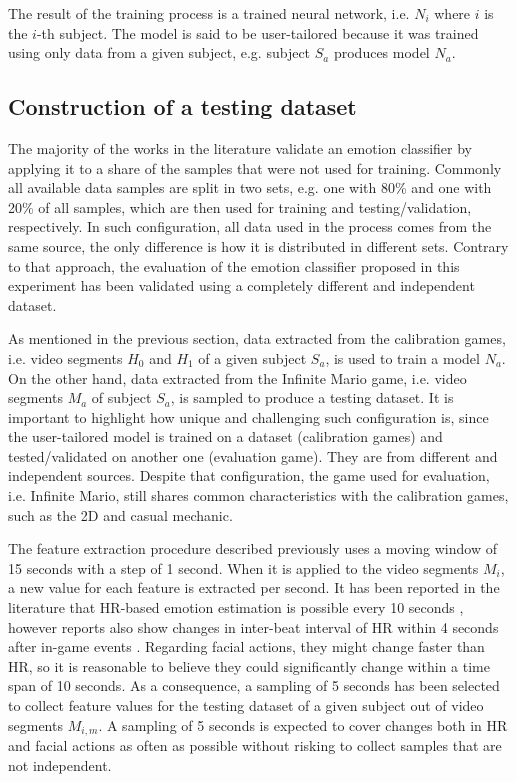 The result of the training process is a trained neural network, i.e. $N_i$ where $i$ is the $i$-th subject. The model is said to be user-tailored because it was trained using only data from a given subject, e.g. subject $S_a$ produces model $N_a$.

\subsection{Construction of a testing dataset}
\label{sec:experiment2-construction-validation}

The majority of the works in the literature validate an emotion classifier by applying it to a share of the samples that were not used for training. Commonly all available data samples are split in two sets, e.g. one with 80\% and one with 20\% of all samples, which are then used for training and testing/validation, respectively. In such configuration, all data used in the process comes from the same source, the only difference is how it is distributed in different sets. Contrary to that approach, the evaluation of the emotion classifier proposed in this experiment has been validated using a completely different and independent dataset.

As mentioned in the previous section, data extracted from the calibration games, i.e. video segments $H_0$ and $H_1$ of a given subject $S_a$, is used to train a model $N_a$. On the other hand, data extracted from the Infinite Mario game, i.e. video segments $M_a$ of subject $S_a$, is sampled to produce a testing dataset. It is important to highlight how unique and challenging such configuration is, since the user-tailored model is trained on a dataset (calibration games) and tested/validated on another one (evaluation game). They are from different and independent sources. Despite that configuration, the game used for evaluation, i.e. Infinite Mario, still shares common characteristics with the calibration games, such as the 2D and casual mechanic.

The feature extraction procedure described previously uses a moving window of 15 seconds with a step of 1 second. When it is applied to the video segments $M_i$, a new value for each feature is extracted per second. It has been reported in the literature that HR-based emotion estimation is possible every 10 seconds \parencite{valenza2014revealing}, however reports also show changes in inter-beat interval of HR within 4 seconds after in-game events \parencite{ravaja20051}. Regarding facial actions, they might change faster than HR, so it is reasonable to believe they could significantly change within a time span of 10 seconds. As a consequence, a sampling of 5 seconds has been selected to collect feature values for the testing dataset of a given subject out of video segments $M_{i,m}$. A sampling of 5 seconds is expected to cover changes both in HR and facial actions as often as possible without risking to collect samples that are not independent.

